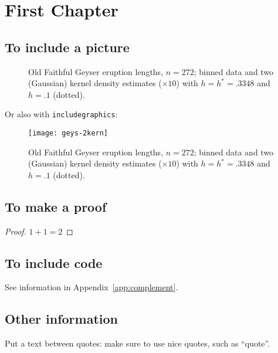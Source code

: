 \chapter{First Chapter} 

\section{To include a picture}
\begin{figure}[hbt!]%
  \caption[Geyser data: binned histogram, Silverman's and another
  kernel]%
  {Old Faithful Geyser eruption lengths, $n=272$; binned data and two
    (Gaussian) kernel density estimates ($\times 10$) with $h=h^*= .3348$
    and $h= .1$ (dotted).}%
  \label{fig:geys1}
\end{figure}

Or also with \texttt{includegraphics}:
\begin{figure}[hbt!]%
  \centering
  \texttt{[image: geys-2kern]} %
  \caption[Geyser data: binned histogram, Silverman's and another
  kernel]%
  {Old Faithful Geyser eruption lengths, $n=272$; binned data and two
    (Gaussian) kernel density estimates ($\times 10$) with $h=h^*= .3348$
    and $h= .1$ (dotted).}%
  \label{fig:geys2}
\end{figure}

\section{To make a proof}
\begin{proof}
  $1 + 1 = 2$
\end{proof}

\section{To include \Rp code}
See information in Appendix~\ref{app:complement}.


\section{Other information}
Put a text between quotes: make sure to use nice quotes, such as ``quote''.

